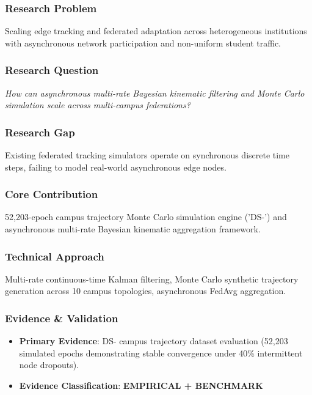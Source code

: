 \documentclass[11pt,letterpaper]{article}
\begin{document}
\subsubsection{Research Problem}
Scaling edge tracking and federated adaptation across heterogeneous institutions with asynchronous network participation and non-\allowbreak uniform student traffic.

\subsubsection{Research Question}
\begin{tcolorbox}[colback=blue!3!white,colframe=blue!50!black,title=Primary Scientific Question]
\textit{How can asynchronous multi-\allowbreak rate Bayesian kinematic filtering and Monte Carlo simulation scale across multi-\allowbreak campus federations?}
\end{tcolorbox}

\subsubsection{Research Gap}
Existing federated tracking simulators operate on synchronous discrete time steps, failing to model real-\allowbreak world asynchronous edge nodes.

\subsubsection{Core Contribution}
52,203-\allowbreak epoch campus trajectory Monte Carlo simulation engine ('DS-') and asynchronous multi-\allowbreak rate Bayesian kinematic aggregation framework.

\subsubsection{Technical Approach}
Multi-\allowbreak rate continuous-\allowbreak time Kalman filtering, Monte Carlo synthetic trajectory generation across 10 campus topologies, asynchronous FedAvg aggregation.

\subsubsection{Evidence \& Validation}
\begin{itemize}[leftmargin=*]
    \item \textbf{Primary Evidence}: DS- campus trajectory dataset evaluation (52,203 simulated epochs demonstrating stable convergence under 40\% intermittent node dropouts).
    \item \textbf{Evidence Classification}: \textbf{EMPIRICAL + BENCHMARK}
\end{itemize}
\end{document}
